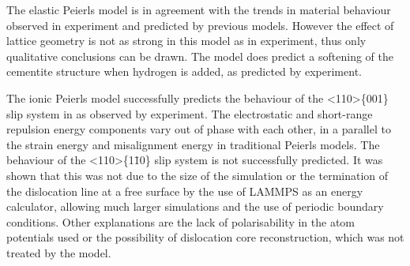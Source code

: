 The elastic Peierls model is in agreement with the trends in material behaviour observed in experiment and predicted by previous models. However the effect of lattice geometry is not as strong in this model as in experiment, thus only qualitative conclusions can be drawn. The model does predict a softening of the cementite structure when hydrogen is added, as predicted by experiment.

The ionic Peierls model successfully predicts the behaviour of the <110>\{001\} slip system in  as observed by experiment. The electrostatic and short-range repulsion energy components vary out of phase with each other, in a parallel to the strain energy and misalignment energy in traditional Peierls models. The behaviour of the <110>\{1\={1}0\} slip system is not successfully predicted. It was shown that this was not due to the size of the simulation or the termination of the dislocation line at a free surface by the use of LAMMPS as an energy calculator, allowing much larger simulations and the use of periodic boundary conditions. Other explanations are the lack of polarisability in the atom potentials used or the possibility of dislocation core reconstruction, which was not treated by the model.





















